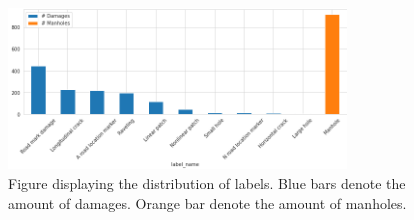 \begin{figure}[ht]
\centering
\includegraphics[width=0.8\textwidth,keepaspectratio]{images/4_data/label-counts.png}
\captionsetup{width=.90\textwidth}
\caption{Figure displaying the distribution of labels. Blue bars denote the amount of damages. Orange bar denote the amount of manholes.}
\label{fig:distribution-labels}
\end{figure}

